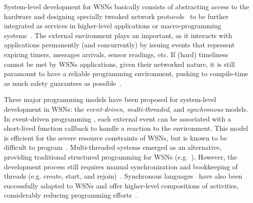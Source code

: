 \documentclass[10pt]{sensys-proc}
\begin{document}
\begin{comment}
TODO
Wireless sensor networks (WSNs) are composed of a large number of tiny devices 
(known as ``motes'') capable of sensing the environment and communicating among 
them.
WSNs are usually employed to continuously monitor physical phenomena in large 
or unreachable areas, such as wildfire in forests and air temperature in 
buildings.
Each mote features limited processing capabilities, a short-range radio link, 
and one or more sensors (e.g. light and temperature) \cite{wsn.survey}.

Applications developed for wireless sensor networks (WSNs) typically perform a 
succession of sensing, processing, actuating, and communicating.
This process involves an external environment, which concurrently interacts 
with the application by issuing events that represent expiring timers, messages 
arrivals, sensor readings, etc.
\end{comment}

System-level development for WSNs basically consists of abstracting access to 
the hardware and designing specially tweaked network 
protocols~\cite{wsn.tos,wsn.survey} to be further integrated as services in 
higher-level applications or macro-programming systems~\cite{wsn.state_of_art}.
The external environment plays an important, as it interacts with applications 
permanently (and concurrently) by issuing events that represent expiring 
timers, messages arrivals, sensor readings, etc.
If (hard) timeliness cannot be met by WSNs applications, given their networked 
nature, it is still paramount to have a reliable programming environment, 
pushing to compile-time as much safety guarantees as 
possible~\cite{wsn.decade}.

Three major programming models have been proposed for system-level development 
in WSNs: the \emph{event-driven}, \emph{multi-threaded}, and \emph{synchronous} 
models.
%
In event-driven programming \cite{wsn.tos,wsn.contiki}, each external event can 
be associated with a short-lived function callback to handle a reaction to the 
environment.
This model is efficient for the severe resource constraints of WSNs, but is 
known to be difficult to 
program~\cite{sync_async.cooperative,wsn.protothreads}.
%
Multi-threaded systems emerged as an alternative, providing traditional 
structured programming for WSNs (e.g.~\cite{wsn.protothreads,wsn.mantisos}).
However, the development process still requires manual synchronization and 
bookkeeping of threads (e.g. create, start, and 
rejoin)~\cite{sync_async.threadsproblems}.
%
Synchronous languages~\cite{rp.twelve} have also been successfully adapted to 
WSNs and offer higher-level compositions of activities, considerably reducing 
programming efforts~\cite{wsn.sol,wsn.osm}.
\end{document}
